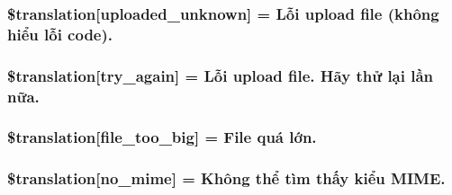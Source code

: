 \subsubsection[{\$translation}]{\setlength{\rightskip}{0pt plus 5cm}\$translation\mbox{[}\textquotesingle{}uploaded\+\_\+unknown\textquotesingle{}\mbox{]} = \textquotesingle{}Lỗi {\bf upload} file (không hiểu lỗi code).\textquotesingle{}}\label{class_8upload_8vn___v_n_8php_a4a9168e922b827e6a28b5db1c00774ca}
\hypertarget{class_8upload_8vn___v_n_8php_a3afc377bd803683314f413a814243066}{}
\subsubsection[{\$translation}]{\setlength{\rightskip}{0pt plus 5cm}\$translation\mbox{[}\textquotesingle{}try\+\_\+again\textquotesingle{}\mbox{]} = \textquotesingle{}Lỗi {\bf upload} file. Hãy thử lại lần nữa.\textquotesingle{}}\label{class_8upload_8vn___v_n_8php_a3afc377bd803683314f413a814243066}
\hypertarget{class_8upload_8vn___v_n_8php_a476278eb4a0c3df56af068e2d511a741}{}
\subsubsection[{\$translation}]{\setlength{\rightskip}{0pt plus 5cm}\$translation\mbox{[}\textquotesingle{}file\+\_\+too\+\_\+big\textquotesingle{}\mbox{]} = \textquotesingle{}File quá lớn.\textquotesingle{}}\label{class_8upload_8vn___v_n_8php_a476278eb4a0c3df56af068e2d511a741}
\hypertarget{class_8upload_8vn___v_n_8php_a191a55df8e3bb7f3c51b70f3c1932e02}{}
\subsubsection[{\$translation}]{\setlength{\rightskip}{0pt plus 5cm}\$translation\mbox{[}\textquotesingle{}no\+\_\+mime\textquotesingle{}\mbox{]} = \textquotesingle{}Không thể tìm thấy kiểu M\+I\+M\+E.\textquotesingle{}}\label{class_8upload_8vn___v_n_8php_a191a55df8e3bb7f3c51b70f3c1932e02}
\hypertarget{class_8upload_8vn___v_n_8php_a4d32343e2699edd6fd435f9c832cb9c7}{}
